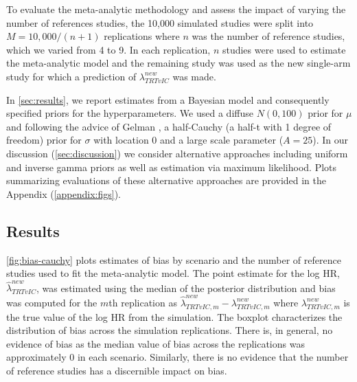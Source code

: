 \documentclass[11pt,final,fleqn]{article}\usepackage[]{graphicx}\usepackage[]{color}
\begin{document}
To evaluate the meta-analytic methodology and assess the impact of varying the number of references studies, the 10,000 simulated studies were split into $M=10,000/(n+1)$ replications where $n$ was the number of reference studies, which we varied from 4 to 9. In each replication, $n$ studies were used to estimate the meta-analytic model and the remaining study was used as the new single-arm study for which a prediction of $\lambda^{new}_{TRTvIC}$ was made. 

In \autoref{sec:results}, we report estimates from a Bayesian model and consequently specified priors for the hyperparameters. We used a diffuse $N(0, 100)$ prior for $\mu$ and following the advice of Gelman \cite{gelman2006prior}, a half-Cauchy (a half-t with 1 degree of freedom) prior for $\sigma$ with location $0$ and a large scale parameter ($A = 25$). In our discussion (\autoref{sec:discussion}) we consider alternative approaches including uniform and inverse gamma priors as well as estimation via maximum likelihood. Plots summarizing evaluations of these alternative approaches are provided in the Appendix (\autoref{appendix:figs}).

\subsection{Results} \label{sec:results}
\autoref{fig:bias-cauchy} plots estimates of bias by scenario and the number of reference studies used to fit the meta-analytic model. The point estimate for the log HR, $\hat{\lambda}^{new}_{TRTvIC}$, was estimated using the median of the posterior distribution and bias was computed for the $m$th replication as $\hat{\lambda}^{new}_{TRTvIC,m} - \lambda^{new}_{TRTvIC,m}$ where $\lambda^{new}_{TRTvIC,m}$ is the true value of the log HR from the simulation. The boxplot characterizes the distribution of bias across the simulation replications. There is, in general, no evidence of bias as the median value of bias across the replications was approximately 0 in each scenario. Similarly, there is no evidence that the number of reference studies has a discernible impact on bias. 
\end{document}
